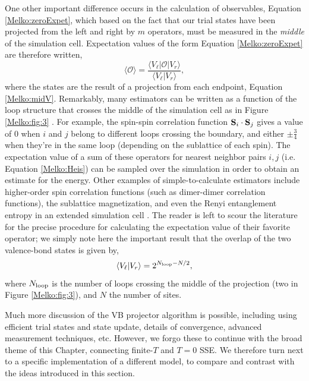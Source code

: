 \documentclass[vecphys]{svmult}
\begin{document}
One other important difference occurs in the calculation of observables, Equation \ref{Melko:zeroExpet}, which based on the fact that our trial states have been projected from the left and right by $m$ operators, must be measured in the {\em middle} of the simulation cell.
Expectation values of the form Equation \ref{Melko:zeroExpet} are therefore written,
\begin{equation}
\langle \mathcal{O} \rangle = \frac{\langle V_{\ell} | \mathcal{O} | V_r \rangle}{\langle V_{\ell} |   V_r \rangle},
\end{equation}
where the states are the result of a projection from each endpoint, Equation \ref{Melko:midV}.  
Remarkably, many estimators can be written as a function of the loop structure that crosses the middle of the simulation cell as in Figure \ref{Melko:fig:3} \cite{Melko:Beach06,Melko:AWSBeach,Melko:Sandvik10a}.
For example, the spin-spin correlation function ${\bf S}_i \cdot {\bf S}_j$ gives a value of 0 when $i$ and $j$ belong to different loops crossing the boundary, and either $ \pm \frac{3}{4}$ when they're in the same loop (depending on the sublattice of each spin).
The expectation value of a sum of these operators for nearest neighbor pairs $i,j$ (i.e. Equation \ref{Melko:Heis}) can be sampled over the simulation in order to obtain an estimate for the energy.
Other examples of simple-to-calculate estimators include higher-order spin correlation functions (such as dimer-dimer correlation functions), the sublattice magnetization, and even the Renyi entanglement entropy in an extended simulation cell \cite{Melko:Hastings10}.  The reader is left to scour the literature for the precise procedure for calculating the expectation value of their favorite operator; we simply note here the important result that 
the overlap of the two valence-bond states is given by,
\begin{equation}
\langle V_{\ell} |   V_r \rangle = 2^{N_{\rm loop} - N/2},
\end{equation}
where $N_{\rm loop}$ is the number of loops crossing the middle of the projection (two in Figure \ref{Melko:fig:3}), and $N$ the number of sites. 

Much more discussion of the VB projector algorithm is possible, including using efficient trial states and state update, details of convergence, advanced measurement techniques, etc. However, we forgo these to continue with the broad theme of this Chapter, connecting finite-$T$ and $T=0$ SSE.  We therefore turn next to a specific implementation of a different model, to compare and contrast with the ideas introduced in this section.
\end{document}
